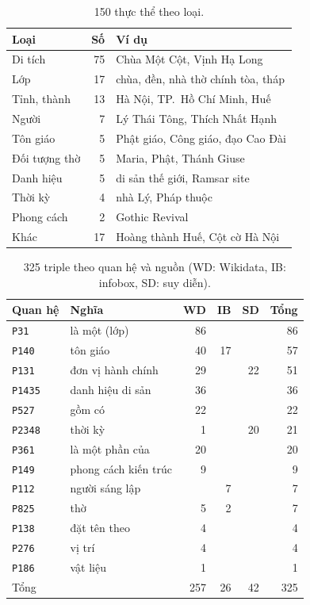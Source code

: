 \begin{table}[!htb]
\centering
\caption{150 thực thể theo loại.}
\label{tab:app-entities}
\footnotesize
\setlength{\tabcolsep}{3pt}
\begin{tabular}{@{}lr>{\raggedright\arraybackslash}p{4.9cm}@{}}
\toprule
Loại & Số & Ví dụ \\
\midrule
Di tích & 75 & Chùa Một Cột, Vịnh Hạ Long \\
Lớp & 17 & chùa, đền, nhà thờ chính tòa, tháp \\
Tỉnh, thành & 13 & Hà Nội, TP.~Hồ Chí Minh, Huế \\
Người & 7 & Lý Thái Tông, Thích Nhất Hạnh \\
Tôn giáo & 5 & Phật giáo, Công giáo, đạo Cao Đài \\
Đối tượng thờ & 5 & Maria, Phật, Thánh Giuse \\
Danh hiệu & 5 & di sản thế giới, Ramsar site \\
Thời kỳ & 4 & nhà Lý, Pháp thuộc \\
Phong cách & 2 & Gothic Revival \\
Khác & 17 & Hoàng thành Huế, Cột cờ Hà Nội \\
\bottomrule
\end{tabular}
\end{table}

\begin{table}[!htb]
\centering
\caption{325 triple theo quan hệ và nguồn (WD: Wikidata, IB: infobox, SD: suy diễn).}
\label{tab:app-relations}
\footnotesize
\setlength{\tabcolsep}{3pt}
\begin{tabular}{@{}llrrrr@{}}
\toprule
Quan hệ & Nghĩa & WD & IB & SD & Tổng \\
\midrule
\texttt{P31} & là một (lớp) & 86 & & & 86 \\
\texttt{P140} & tôn giáo & 40 & 17 & & 57 \\
\texttt{P131} & đơn vị hành chính & 29 & & 22 & 51 \\
\texttt{P1435} & danh hiệu di sản & 36 & & & 36 \\
\texttt{P527} & gồm có & 22 & & & 22 \\
\texttt{P2348} & thời kỳ & 1 & & 20 & 21 \\
\texttt{P361} & là một phần của & 20 & & & 20 \\
\texttt{P149} & phong cách kiến trúc & 9 & & & 9 \\
\texttt{P112} & người sáng lập & & 7 & & 7 \\
\texttt{P825} & thờ & 5 & 2 & & 7 \\
\texttt{P138} & đặt tên theo & 4 & & & 4 \\
\texttt{P276} & vị trí & 4 & & & 4 \\
\texttt{P186} & vật liệu & 1 & & & 1 \\
\midrule
Tổng & & 257 & 26 & 42 & 325 \\
\bottomrule
\end{tabular}
\end{table}

